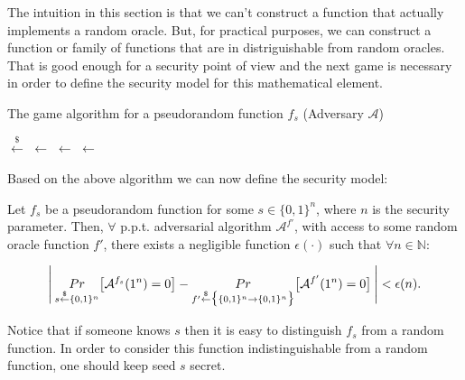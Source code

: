 The intuition in this section is that we can't construct a function that actually implements a random oracle. But, for practical purposes, we can construct a function or family of functions that are in distriguishable from random oracles. That is good enough for a security point of view and the next game is necessary in order to define the security model for this mathematical element.
\vspace{0.3cm}
\begin{algorithm}
  \caption{\label{alg:pseudorandom}The \textsf{game} algorithm
    for a pseudorandom function $f_{s}$ (Adversary $\mathcal{A}$)}
    \begin{algorithmic}[1]
            \State {} $\overset{\$}{\gets}$ 
                \State {} $\gets$ 
              \Else
                \State {} $\gets$ 
              \EndIf
              \State {} $\gets$ 
                \State {}
              \EndIf
            \State{}
        \EndFunction
    \end{algorithmic}
\end{algorithm}
\vspace{0.3cm}

\noindent Based on the above algorithm we can now define the security model:

\begin{definition}
  Let $f_{s}$ be a pseudorandom function for some $s \in \{0,1\}^{n}$, where $n$ is the security parameter. Then, $\forall$ p.p.t. adversarial algorithm $\mathcal{A}^{f'}$, with access to some random oracle function $f'$, there exists a negligible function $\epsilon(\cdot)$ such that $\forall n \in \mathbb{N}$:

  \begin{equation} \label{eq:secmodel}
    \Bigg{\lvert} \: \underset{s \overset{\$}{\gets} \{0,1\}^{n}}{Pr} \big{[} \mathcal{A}^{f_{s}}(1^{n}) = 0 \big{]} - \underset{f' \overset{\$}{\gets} \big{\{} \{0,1\}^{n}  \rightarrow \{0,1\}^{n} \big{\}}}{Pr} \big{[} \mathcal{A}^{f'}(1^{n}) = 0 \big{]} \: \Bigg{\rvert} < \epsilon(n).
  \end{equation}
\end{definition}

Notice that if someone knows $s$ then it is easy to distinguish $f_s$ from a random function. In order to consider this function indistinguishable from a random function, one should keep seed $s$ secret.
\clearpage
\pagebreak

